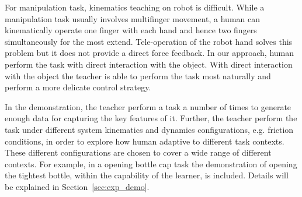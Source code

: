 For manipulation task, kinematics teaching on robot is difficult. While a manipulation task usually involves multifinger movement, a human can kinematically operate one finger with each hand and hence two fingers simultaneously for the most extend. Tele-operation of the robot hand solves this problem but it does not provide a direct force feedback. In our approach, human perform the task with direct interaction with the object. With direct interaction with the object the teacher is able to perform the task most naturally and perform a more delicate control strategy. %


In the demonstration, the teacher perform a task a number of times to generate enough data for capturing the key features of it. Further, the teacher perform the task under different system kinematics and dynamics configurations, e.g. friction conditions, in order to explore how human adaptive to different task contexts. These different configurations are chosen to cover a wide range of different contexts. For example, in a opening bottle cap task the demonstration of opening the tightest bottle, within the capability of the learner, is included. Details will be explained in Section~\ref{sec:exp_demo}.



